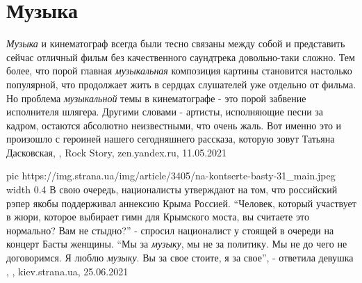  
 
 
 
 
\chapter{Музыка}
\label{sec:slova.muzyka}

\emph{Музыка} и кинематограф всегда были тесно связаны между собой и представить
сейчас отличный фильм без качественного саундтрека довольно-таки сложно. Тем
более, что порой главная \emph{музыкальная} композиция картины становится настолько
популярной, что продолжает жить в сердцах слушателей уже отдельно от фильма.
Но проблема \emph{музыкальной} темы в кинематографе - это порой забвение исполнителя
шлягера. Другими словами - артисты, исполняющие песни за кадром, остаются
абсолютно неизвестными, что очень жаль. Вот именно это и произошло с героиней
нашего сегодняшнего рассказа, которую зовут Татьяна Дасковская,
, Rock Story,
zen.yandex.ru, 11.05.2021

\ifcmt
  pic https://img.strana.ua/img/article/3405/na-kontserte-basty-31_main.jpeg
  width 0.4
\fi
В свою очередь, националисты утверждают на том, что российский рэпер якобы
поддерживал аннексию Крыма Россией.  \enquote{Человек, который участвует в жюри,
которое выбирает гимн для Крымского моста, вы считаете это нормально? Вам не
стыдно?} - спросил националист у стоящей в очереди на концерт Басты женщины.
\enquote{Мы за \emph{музыку}, мы не за политику. Мы не до чего не договоримся. Я люблю
\emph{музыку}. Вы за свое стоите, я за свое}, - ответила девушка
  , , kiev.strana.ua, 25.06.2021
